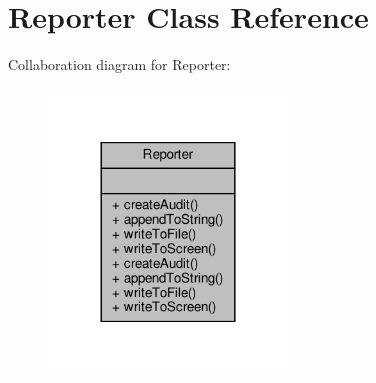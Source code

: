 \hypertarget{classReporter}{}\section{Reporter Class Reference}
\label{classReporter}


Collaboration diagram for Reporter\+:
\nopagebreak
\begin{figure}[H]
\begin{center}
\leavevmode
\includegraphics[width=180pt]{classReporter__coll__graph}
\end{center}
\end{figure}
